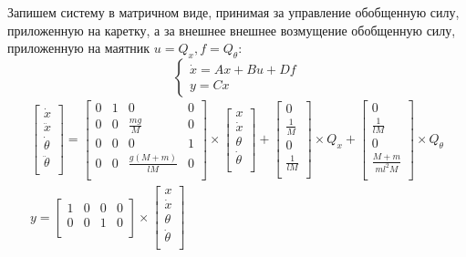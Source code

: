 Запишем систему в матричном виде, принимая за управление обобщенную силу, приложенную на каретку, а за внешнее 
внешнее возмущение обобщенную силу, приложенную на маятник $u = Q_x, f = Q_{\theta}$:
\begin{equation}
    \begin{cases}
        \dot{x} = Ax + Bu + Df \\ 
        y = Cx
    \end{cases}
    \label{eq:linear_model}
\end{equation}
\begin{equation}
    \begin{array}{cc}
        \begin{bmatrix}
        \dot{x} \\
        \ddot{x} \\
        \dot{\theta} \\
        \ddot{\theta} \\
    \end{bmatrix} = \begin{bmatrix}
        0 & 1 & 0 & 0 \\
        0 & 0 & \frac{mg}{M} & 0 \\
        0 & 0 & 0 & 1 \\
        0 & 0 & \frac{g(M + m)}{lM} & 0 \\
    \end{bmatrix} \times \begin{bmatrix}
        x \\
        \dot{x} \\
        \theta \\
        \dot{\theta} \\
    \end{bmatrix} + \begin{bmatrix}
        0 \\
        \frac{1}{M} \\
        0 \\
        \frac{1}{lM} \\
    \end{bmatrix} \times Q_x + \begin{bmatrix}
        0 \\
        \frac{1}{lM} \\
        0 \\
        \frac{M + m}{ml^2M} \\ 
    \end{bmatrix} \times Q_{\theta}  \\[4em]
    y = \begin{bmatrix}
        1 & 0 & 0 & 0 \\
        0 & 0 & 1 & 0 \\ 
    \end{bmatrix} \times \begin{bmatrix}
        x \\
        \dot{x} \\
        \theta \\
        \dot{\theta} \\
    \end{bmatrix}
    \end{array}
\end{equation}
